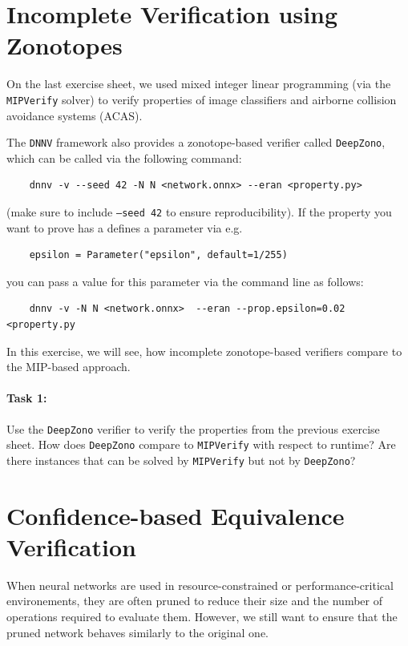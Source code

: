 \documentclass[11pt,fleqn]{article}
\begin{document}

\section*{Incomplete Verification using Zonotopes}

On the last exercise sheet, we used mixed integer linear programming (via the \texttt{MIPVerify} solver) to verify 
properties of image classifiers and airborne collision avoidance systems (ACAS).

The \texttt{DNNV} framework also provides a zonotope-based verifier called \texttt{DeepZono}, which can be called via the following command:
\begin{verbatim}
    dnnv -v --seed 42 -N N <network.onnx> --eran <property.py>
\end{verbatim}
(make sure to include \texttt{--seed 42} to ensure reproducibility).
If the property you want to prove has a defines a parameter via e.g. 
\begin{verbatim}
    epsilon = Parameter("epsilon", default=1/255)
\end{verbatim}
you can pass a value for this parameter via the command line as follows:
\begin{verbatim}
    dnnv -v -N N <network.onnx>  --eran --prop.epsilon=0.02 <property.py
\end{verbatim}

In this exercise, we will see, how incomplete zonotope-based verifiers compare to the MIP-based approach.

\paragraph{Task 1:}
Use the \texttt{DeepZono} verifier to verify the properties from the previous exercise sheet.
How does \texttt{DeepZono} compare to \texttt{MIPVerify} with respect to runtime?
Are there instances that can be solved by \texttt{MIPVerify} but not by \texttt{DeepZono}?


\section*{Confidence-based Equivalence Verification}

When neural networks are used in resource-constrained or performance-critical environements,
they are often pruned to reduce their size and the number of operations required to evaluate them.
However, we still want to ensure that the pruned network behaves similarly to the original one.
\end{document}
